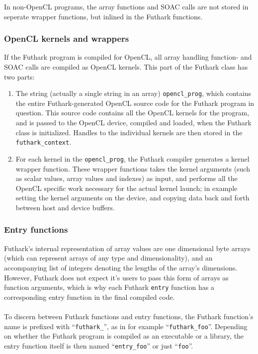 \begin{description}
  In non-OpenCL programs, the array functions and SOAC calls are not stored in
  seperate wrapper functions, but inlined in the Futhark functions.

\subsubsection{OpenCL kernels and wrappers}
  If the Futhark program is compiled for OpenCL, all array handling function- and
  SOAC calls are compiled as OpenCL kernels. This part of the Futhark class
  has two parts:
  \begin{enumerate}
  \item The string (actually a single string in an array) \texttt{opencl\_prog}, which contains the entire
  Futhark-generated OpenCL source code for the Futhark program in question.
  This source code contains all the OpenCL kernels for the program, and is
  passed to the OpenCL device, compiled and loaded, when the Futhark class is
  initialized. Handles to the individual kernels are then stored in the \texttt{futhark\_context}.

  \item For each kernel in the \texttt{opencl\_prog}, the Futhark compiler
    generates a kernel wrapper function. These wrapper functions takes the
    kernel arguments (such as scalar values, array values and indexes) as input,
    and performs all the OpenCL specific work necessary for the actual kernel
    launch; in example setting the kernel arguments on the device, and copying
    data back and forth between host and device buffers.
  \end{enumerate}

\subsubsection{Entry functions}
\label{csharpentries}
Futhark's internal representation of array values are one dimensional byte
arrays (which can represent arrays of any type and dimensionality), and an
accompanying list of integers denoting the lengths of the array's dimensions.
However, Futhark does not expect it's users to pass this form of arrays as
function arguments, which is why each Futhark \texttt{entry} function has a
corresponding entry function in the final compiled code.
\\\\
To discern between Futhark functions and entry functions, the Futhark function's
name is prefixed with ``\texttt{futhark\_}'', as in for example
``\texttt{futhark\_foo}''.
Depending on whether the Futhark program is compiled as an executable or a
library, the entry function itself is then named ``\texttt{entry\_foo}'' or
just ``\texttt{foo}''.


\end{description}
